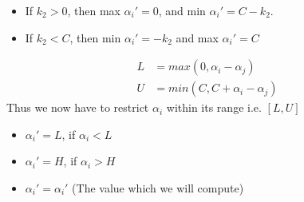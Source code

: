 \documentclass[10pt]{article}
\begin{document}
\begin{itemize}
	\item If $k_{2} > 0$, then max $\alpha_{i}'=0$, and min $\alpha_{i}' = C - k_{2}$.
	\item If $k_{2} < C$, then min $\alpha_{i}' = -k_{2}$ and max $\alpha_{i}' = C$
\end{itemize}
\begin{align*}
L &= max(0,\alpha_{i}-\alpha_{j})\\
U &= min(C,C+\alpha_{i}-\alpha_{j})
\end{align*}
Thus we now have to restrict $\alpha_{i}$ within its range i.e. $[L,U]$
\begin{itemize}
	\item $\alpha_{i}' = L$, if $\alpha_{i} < L$
	\item $\alpha_{i}' = H$, if $\alpha_{i} > H$
	\item $\alpha_{i}' = \alpha_{i}'$ (The value which we will compute)
\end{itemize}

\newpage
\end{document}
